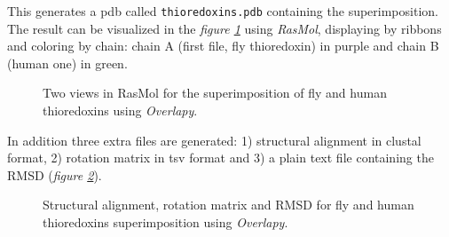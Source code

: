 \documentclass{article}
\begin{document}
This generates a pdb called \texttt{thioredoxins.pdb} containing the superimposition. The result can be visualized in the \textit{figure \ref{fig:super}} using \textit{RasMol}\cite{18}, displaying by ribbons and coloring by chain: chain A (first file, fly thioredoxin) in purple and chain B (human one) in green.

\pagebreak

\begin{figure}[h]
	\centering
	\caption{Two views in RasMol for the superimposition of fly and human thioredoxins using \textit{Overlapy}.}
	\label{fig:super}
\end{figure}
In addition three extra files are generated: 1) structural alignment in clustal format, 2) rotation matrix in tsv format and 3) a plain text file containing the RMSD (\textit{figure \ref{fig:alignmatrix}}).
\begin{figure}[h!]
	\centering
	\caption{Structural alignment, rotation matrix and RMSD for fly and human thioredoxins superimposition using \textit{Overlapy}.}
	\label{fig:alignmatrix}
\end{figure}
\end{document}
